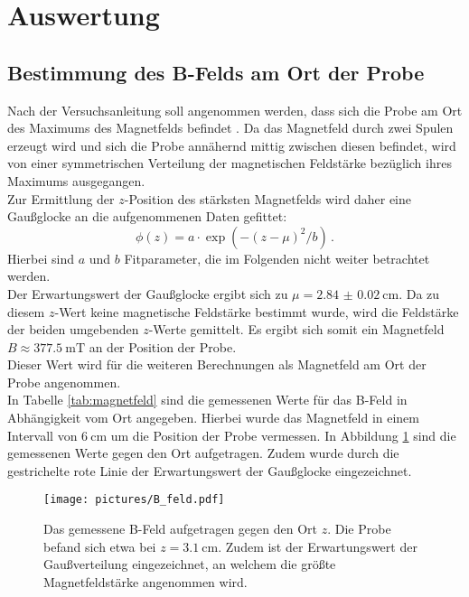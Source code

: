\section{Auswertung}
\label{sec:Auswertung}
%
\subsection{Bestimmung des B-Felds am Ort der Probe}
Nach der Versuchsanleitung soll angenommen werden, dass sich die Probe am Ort des Maximums des Magnetfelds befindet \cite{Anleitung}.
Da das Magnetfeld durch zwei Spulen erzeugt wird und sich die Probe annähernd mittig zwischen diesen befindet, wird von einer symmetrischen Verteilung der magnetischen Feldstärke bezüglich ihres Maximums ausgegangen.\\ Zur Ermittlung der $z$-Position des stärksten Magnetfelds wird daher eine Gaußglocke an die aufgenommenen Daten gefittet:
\begin{equation}
	\phi(z)=a\cdot\exp\left({-(z-\mu)^2/b}\right) \, \mathrm{.}
\end{equation}
Hierbei sind $a$ und $b$ Fitparameter, die im Folgenden nicht weiter betrachtet werden.\\
Der Erwartungswert der Gaußglocke ergibt sich zu $\mu=\SI{2.84(2)}{\centi\meter}$. Da zu diesem $z$-Wert keine magnetische Feldstärke bestimmt wurde, wird die Feldstärke der beiden umgebenden $z$-Werte gemittelt.
Es ergibt sich somit ein Magnetfeld $B\approx \SI{377.5}{\milli\tesla}$ an der Position der Probe.\\
Dieser Wert wird für die weiteren Berechnungen als Magnetfeld am Ort der Probe angenommen.\\
In Tabelle \ref{tab:magnetfeld} sind die gemessenen Werte für das B-Feld in Abhängigkeit vom Ort angegeben. Hierbei wurde das Magnetfeld in einem Intervall von $\SI{6}{\centi\meter}$ um die Position der Probe vermessen. In Abbildung \ref{fig:magnetfeld} sind die gemessenen Werte gegen den Ort aufgetragen. Zudem wurde durch die gestrichelte rote Linie der Erwartungswert der Gaußglocke eingezeichnet.
\begin{figure}
  \centering
  \texttt{[image: pictures/B\_feld.pdf]}
  \caption{Das gemessene B-Feld aufgetragen gegen den Ort $z$. Die Probe befand sich etwa bei $z=\SI{3.1}{\centi\meter}$. Zudem ist der Erwartungswert der Gaußverteilung eingezeichnet, an welchem die größte Magnetfeldstärke angenommen wird.}
  \label{fig:magnetfeld}
\end{figure}

\FloatBarrier
